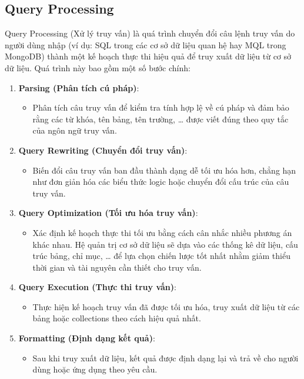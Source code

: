 \subsection{Query Processing}

Query Processing (Xử lý truy vấn) là quá trình chuyển đổi câu lệnh truy vấn do người dùng nhập (ví dụ: SQL trong các cơ sở dữ liệu quan hệ hay MQL trong MongoDB) thành một kế hoạch thực thi hiệu quả để truy xuất dữ liệu từ cơ sở dữ liệu. Quá trình này bao gồm một số bước chính:

\begin{enumerate}
    \item \textbf{Parsing (Phân tích cú pháp)}:
    \begin{itemize}
        \item Phân tích câu truy vấn để kiểm tra tính hợp lệ về cú pháp và đảm bảo rằng các từ khóa, tên bảng, tên trường, … được viết đúng theo quy tắc của ngôn ngữ truy vấn.
    \end{itemize}
    \item \textbf{Query Rewriting (Chuyển đổi truy vấn)}:
    \begin{itemize}
        \item Biến đổi câu truy vấn ban đầu thành dạng dễ tối ưu hóa hơn, chẳng hạn như đơn giản hóa các biểu thức logic hoặc chuyển đổi cấu trúc của câu truy vấn.
    \end{itemize}
    \item \textbf{Query Optimization (Tối ưu hóa truy vấn)}:
    \begin{itemize}
        \item Xác định kế hoạch thực thi tối ưu bằng cách cân nhắc nhiều phương án khác nhau. Hệ quản trị cơ sở dữ liệu sẽ dựa vào các thống kê dữ liệu, cấu trúc bảng, chỉ mục, … để lựa chọn chiến lược tốt nhất nhằm giảm thiểu thời gian và tài nguyên cần thiết cho truy vấn.
    \end{itemize}
    \item \textbf{Query Execution (Thực thi truy vấn)}:
    \begin{itemize}
        \item Thực hiện kế hoạch truy vấn đã được tối ưu hóa, truy xuất dữ liệu từ các bảng hoặc collections theo cách hiệu quả nhất.
    \end{itemize}
    \item \textbf{Formatting (Định dạng kết quả)}:
    \begin{itemize}
        \item Sau khi truy xuất dữ liệu, kết quả được định dạng lại và trả về cho người dùng hoặc ứng dụng theo yêu cầu.
    \end{itemize}
\end{enumerate}

